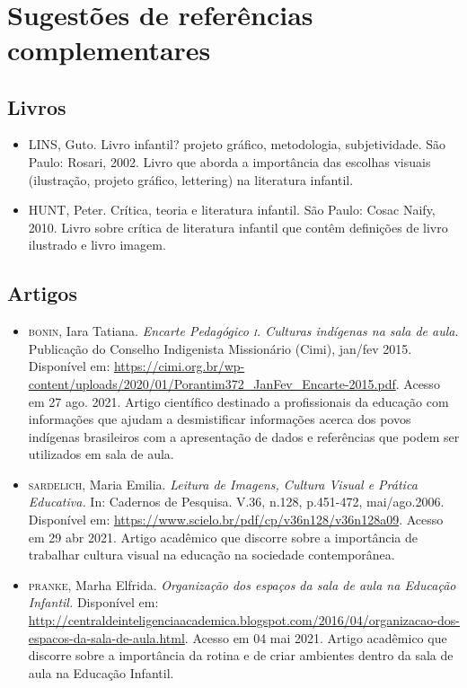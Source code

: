 \documentclass[11pt]{extarticle}
\begin{document}
 
\section{Sugestões de referências complementares}

\subsection{Livros} 

\begin{itemize}
\item LINS, Guto. Livro infantil? projeto gráfico, metodologia, subjetividade. São Paulo: Rosari, 2002.
Livro que aborda a importância das escolhas visuais (ilustração, projeto gráfico, lettering) na literatura infantil.  

\item HUNT, Peter. Crítica, teoria e literatura infantil. São Paulo: Cosac Naify, 2010.
Livro sobre crítica de literatura infantil que contêm definições de livro ilustrado e livro imagem. 
\end{itemize}

\subsection{Artigos}

\begin{itemize}
	\item \textsc{bonin}, Iara Tatiana. \emph{Encarte Pedagógico \textsc{i}. Culturas indígenas na sala de aula}.
	Publicação do Conselho Indigenista Missionário (Cimi), jan/fev 2015. Disponível em: \url{https://cimi.org.br/wp-content/uploads/2020/01/Porantim372_JanFev_Encarte-2015.pdf}. Acesso em 27 ago. 2021.
	Artigo científico destinado a profissionais da educação com informações que ajudam a desmistificar informações
	acerca dos povos indígenas brasileiros com a apresentação de dados e referências que podem ser utilizados em sala de aula.
	\item \textsc{sardelich}, Maria Emilia. \emph{Leitura de Imagens, Cultura Visual e Prática Educativa.} 
In: Cadernos de Pesquisa. V.36, n.128, p.451-472, mai/ago.2006. Disponível em: \url{https://www.scielo.br/pdf/cp/v36n128/v36n128a09}. 
Acesso em 29 abr 2021. 
Artigo acadêmico que discorre sobre a importância de trabalhar cultura 
visual na educação na sociedade contemporânea. 

\item \textsc{pranke}, Marha Elfrida. \emph{Organização dos espaços da sala de aula na Educação Infantil.} Disponível em: 
\url{http://centraldeinteligenciaacademica.blogspot.com/2016/04/organizacao-dos-espacos-da-sala-de-aula.html}. Acesso em 04 mai 2021. 
Artigo acadêmico que discorre sobre a importância da rotina e de criar ambientes dentro da sala de aula na Educação Infantil.  
\end{itemize}
\end{document}
